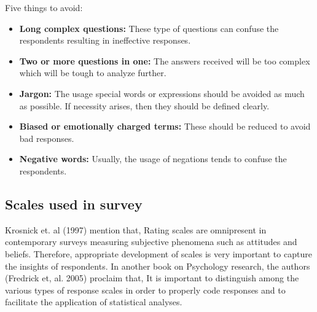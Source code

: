 Five things to avoid:
\begin{itemize}
    \item \textbf{Long complex questions:} These type of questions can confuse the respondents resulting in ineffective responses.\\
    \item \textbf{Two or more questions in one:} The answers received will be too complex which will be tough to analyze further.\\
    \item \textbf{Jargon:} The usage special words or expressions should be avoided as much as possible. If necessity arises, then they should be defined clearly.\\
    \item \textbf{Biased or emotionally charged terms:} These should be reduced to avoid bad responses.\\
    \item \textbf{Negative words:} Usually, the usage of negations tends to confuse the respondents.\\

\end{itemize}

\subsection{Scales used in survey}
Krosnick et. al (1997) mention that, Rating scales are omnipresent in contemporary surveys measuring subjective phenomena such as attitudes and beliefs. Therefore, appropriate development of scales is very important to capture the insights of respondents. In another book on Psychology research, the authors (Fredrick et, al. 2005) proclaim that, It is important to distinguish among the various types of response scales in order to properly code responses and to facilitate the application of statistical analyses.\\

